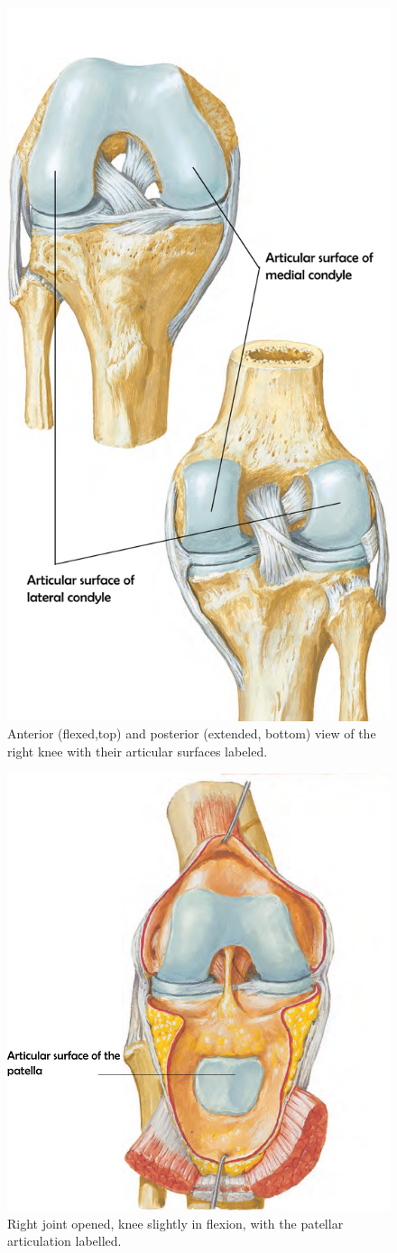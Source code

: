 \documentclass{micro-econ-thesis}
\begin{document}
\begin{figure}[H]
	\centering
	\includegraphics[width=0.7\linewidth]{right_knee_labeled}
	\caption{Anterior (flexed,top) and posterior (extended, bottom) view of the right knee with their articular surfaces labeled. \parencite[p.519]{netter_519_2023}}
	\label{fig:rightkneeplate519}
\end{figure}

\begin{figure} [H]
	\centering
	\includegraphics[width=0.7\linewidth]{patellar_surface}
	\caption[patellar surface]{Right joint opened, knee slightly in flexion, with the patellar articulation labelled. \parencite[p.517]{netter_519_2023}}
	\label{fig:patellarsurface}
\end{figure}
\end{document}
